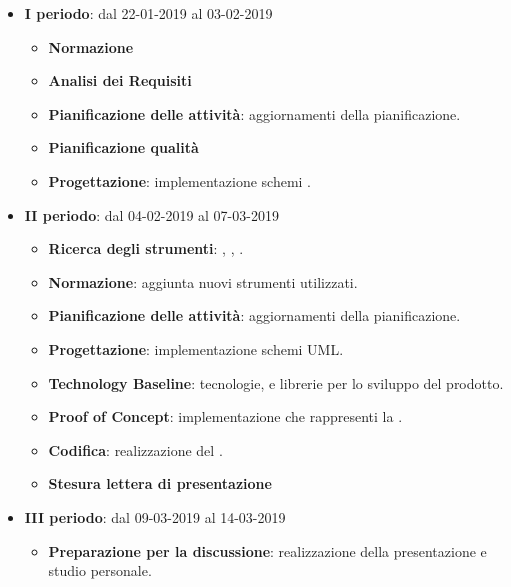 		\begin{itemize}
			\item \textbf{I periodo}: dal 22-01-2019 al 03-02-2019
			\begin{itemize}
    	        \item \textbf{Normazione}
    	        \item \textbf{Analisi dei Requisiti}
    	        \item \textbf{Pianificazione delle attività}: aggiornamenti della pianificazione.
    	        \item \textbf{Pianificazione qualità}
    	        \item \textbf{Progettazione}: implementazione schemi .
        	\end{itemize}
			\item \textbf{II periodo}: dal 04-02-2019 al 07-03-2019
			\begin{itemize}
				\item \textbf{Ricerca degli strumenti}: , , .
    	        \item \textbf{Normazione}: aggiunta nuovi strumenti utilizzati.
    	        \item \textbf{Pianificazione delle attività}: aggiornamenti della pianificazione.
    	        \item \textbf{Progettazione}: implementazione schemi UML.
    	        \item \textbf{Technology Baseline}: tecnologie,  e librerie per lo sviluppo del prodotto.
    	        \item \textbf{Proof of Concept}: implementazione che rappresenti la .
    	        \item \textbf{Codifica}: realizzazione del .
    	        \item \textbf{Stesura lettera di presentazione}
        	\end{itemize}
        	\item \textbf{III periodo}: dal 09-03-2019 al 14-03-2019
			\begin{itemize}
				\item \textbf{Preparazione per la discussione}: realizzazione della presentazione e studio personale.
        	\end{itemize}
		\end{itemize}
        
